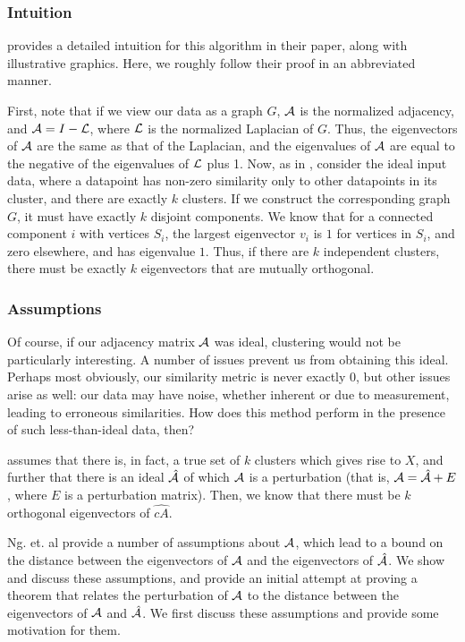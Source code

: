 \subsubsection{Intuition}
\cite{ng2002spectral} provides a detailed intuition for this algorithm in their paper,
along with illustrative graphics. Here, we roughly follow their proof in an
abbreviated manner.

First, note that if we view our data as a graph $G$, $\mathcal{A}$ is the normalized
adjacency, and $\mathcal{A} = I - \mathcal{L}$, where $\mathcal{L}$ is the normalized Laplacian of $G$.
Thus, the eigenvectors of $\mathcal{A}$ are the same as that of the Laplacian, and the
eigenvalues of $\mathcal{A}$ are equal to the negative of the eigenvalues of $\mathcal{L}$ plus
1. Now, as in \cite{ng2002spectral}, consider the ideal input data, where a
datapoint has non-zero similarity only to other datapoints in its cluster, and
there are exactly $k$ clusters. If we construct the corresponding graph $G$, it
must have exactly $k$ disjoint components. We know that for a connected
component $i$ with vertices $S_i$, the largest eigenvector $v_i$ is $1$ for
vertices in $S_i$, and zero elsewhere, and has eigenvalue $1$. Thus, if there
are $k$ independent clusters, there must be exactly $k$ eigenvectors that are
mutually orthogonal.

\subsubsection{Assumptions}
Of course, if our adjacency matrix $\mathcal{A}$ was ideal, clustering would not be
particularly interesting. A number of issues prevent us from obtaining this
ideal. Perhaps most obviously, our similarity metric is never exactly $0$, but
other issues arise as well: our data may have noise, whether inherent or due
to measurement, leading to erroneous similarities. How does this method perform
in the presence of such less-than-ideal data, then?

\cite{ng2002spectral} assumes that there is, in fact, a true set of $k$ clusters
which gives rise to $X$, and further that there is an ideal $\hat{\mathcal{A}}$ of which
$\mathcal{A}$ is a perturbation (that is, $\mathcal{A} = \hat{\mathcal{A}} + E$, where $E$ is a
perturbation matrix). Then, we know that there must be $k$ orthogonal
eigenvectors of $\hat{cA}$.

Ng. et. al provide a number of assumptions about $\mathcal{A}$, which lead to a bound
on the distance between the eigenvectors of $\mathcal{A}$ and the eigenvectors of
$\hat{\mathcal{A}}$. We show and discuss these assumptions, and provide an initial
attempt at proving a theorem that relates the perturbation of $\mathcal{A}$ to the
distance between the eigenvectors of $\mathcal{A}$ and $\hat{\mathcal{A}}$. We first discuss
these assumptions and provide some motivation for them.

